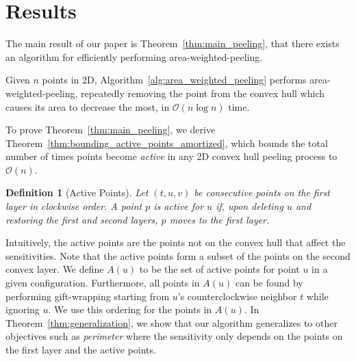 \documentclass{cccg24}
\newcommand{\Oh}[1]{\mathcal{O}\!\lrParents{#1}}
\newcommand{\lrParents}[1]{\left( #1 \right)}
\newcommand{\logn}{\log{n}}
\newtheorem{definition}{Definition}[section]
\begin{document}
\section{Results}
The main result of our paper is Theorem~\ref{thm:main_peeling}, that there exists an algorithm for efficiently performing area-weighted-peeling.

\begin{theorem}\label{thm:main_peeling}
    Given $n$ points in 2D, Algorithm~\ref{alg:area_weighted_peeling} performs area-weighted-peeling, repeatedly removing the point from the convex hull which causes its area to decrease the most, in $\Oh{n\logn}$ time. %
\end{theorem}


To prove Theorem~\ref{thm:main_peeling}, we derive Theorem~\ref{thm:bounding_active_points_amortized}, which bounds the total number of times points become \emph{active} in any 2D convex hull peeling process to $\Oh{n}$. 


\begin{definition}[Active Points]
    Let $(t, u, v)$ be consecutive points on the first layer in clockwise order. A point $p$ is active for $u$ if, upon deleting $u$ and restoring the first and second layers, $p$ moves to the first layer.
\end{definition}

Intuitively, the active points are the points not on the convex hull that affect the sensitivities. 
Note that the active points form a subset of the points on the second convex layer. We define $A(u)$ to be the set of active points for point $u$ in a given configuration. Furthermore, all points in $A(u)$ can be found by performing gift-wrapping starting from $u$'s counterclockwise neighbor $t$ while ignoring $u$. We use this ordering for the points in $A(u)$. In Theorem~\ref{thm:generalization}, we show that our algorithm generalizes to other objectives such as \emph{perimeter} where the sensitivity only depends on the points on the first layer and the active points.
\end{document}
